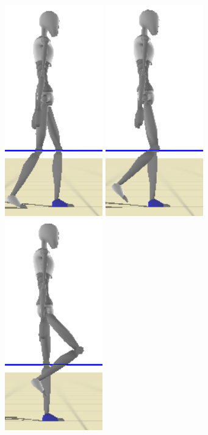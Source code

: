 \documentclass[conference]{acmsiggraph}
\begin{document}
\begin{figure}[t]
\includegraphics[scale=0.17]{images/strips/0_5/1.png}
\includegraphics[scale=0.17]{images/strips/0_5/2.png}
\includegraphics[scale=0.17]{images/strips/0_5/3.png}

\end{figure}
\end{document}
